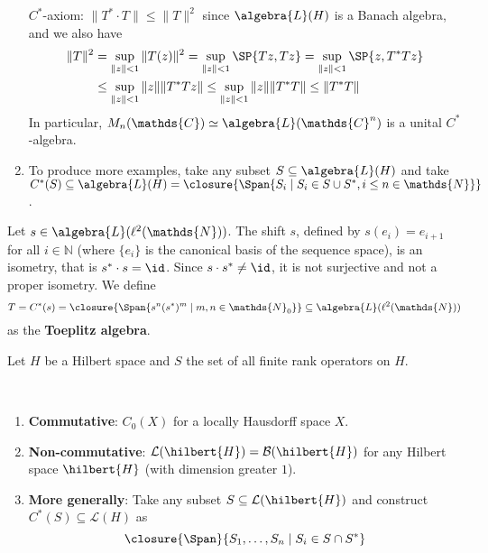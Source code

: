 \documentclass[a4paper]{article}
\begin{document}
\begin{example}
\begin{enumerate}
		      $C^*$-axiom: $\|T^* \cdot T\| \leq \|T\|^2$ since $\algebra{L}(H)$ is a Banach algebra, and we also have
		      \begin{align*}
			      \|T\|^2 & = \sup_{\|z\| < 1} \|T(z)\|^2 = \sup_{\|z\| < 1} \SP{Tz, Tz} = \sup_{\|z\| < 1} \SP{z, T^* T z} \\
			              & \leq \sup_{\|z\| < 1} \|z\| \| T^*T z\| \leq \sup_{\|z\| < 1}  \|z\| \| T^*T\| \leq  \| T^*T\|
		      \end{align*}
		      In particular, $M_n(\mathds{C}) \simeq \algebra{L}(\mathds{C}^n)$ is a unital $C^*$-algebra.
		\item To produce more examples, take any subset $S \subseteq \algebra{L}(H)$ and take $C^*(S) \subseteq \algebra{L}(H) = \closure{\Span\{S_i \mid S_i \in S \cup S^*, i \leq n \in \mathds{N}\}}$.
	\end{enumerate}
\end{example}

\begin{example}
	Let $s \in \algebra{L}(\ell^2(\mathds{N}))$. The shift $s$, defined by $s(e_i) = e_{i+1}$ for all $i \in \mathds{N}$ (where $\{e_i\}$ is the canonical basis of the sequence space), is an isometry, that is $s^* \cdot s = \id$.
	Since $s \cdot s^* \neq \id$, it is not surjective and not a proper isometry.
	We define
	\begin{equation*}
		T = C^*(s) = \closure{\Span\{s^n (s^*)^m \mid m,n \in \mathds{N}_0 \}} \subseteq \algebra{L}(\ell^2(\mathds{N}))
	\end{equation*}
	as the \textbf{Toeplitz algebra}.
\end{example}

\begin{example}
	Let $H$ be a Hilbert space and $S$ the set of all finite rank operators on $H$.

\end{example}

\begin{example}~
	\begin{enumerate}
		\item \textbf{Commutative}: $C_0(X)$ for a locally Hausdorff space $X$.
		\item \textbf{Non-commutative}: $\mathcal{L}(\hilbert{H}) = \mathcal{B}(\hilbert{H})$ for any Hilbert space $\hilbert{H}$ (with dimension greater $1$).
		\item \textbf{More generally}: Take any subset $S \subseteq \mathcal{L}(\hilbert{H})$ and construct $C^*(S) \subseteq \mathcal{L}(H)$ as
		      \begin{equation*}
			      \closure{\Span}\{S_1, \dots, S_n\mid S_i \in S \cap S^*\}
		      \end{equation*}
	\end{enumerate}
\end{example}
\end{document}
